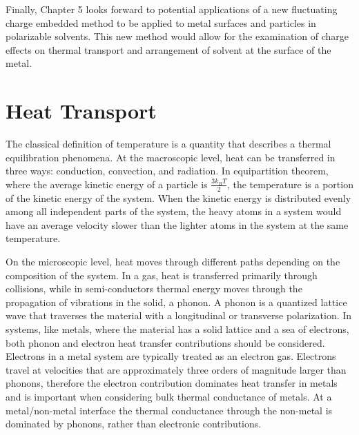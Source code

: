 Finally, Chapter 5 looks forward to potential applications of a new fluctuating charge embedded method to be applied to metal surfaces and particles in polarizable solvents. This new method would allow for the examination of charge effects on thermal transport and arrangement of solvent at the surface of the metal.

\section{Heat Transport}
The classical definition of temperature is a quantity that describes a thermal equilibration phenomena. At the macroscopic level, heat can be transferred in three ways: conduction, convection, and radiation.\cite{Chen2005} 
In equipartition theorem, where the average kinetic energy of a particle is \(\frac{3k_{B}T}{2}\), the temperature is a portion of the kinetic energy of the system. \cite{Goldstein2001}
When the kinetic energy is distributed evenly among all independent parts of the system, the heavy atoms in a system would have an average velocity slower than the lighter atoms in the system at the same temperature.

On the microscopic level, heat moves through different paths depending on the composition of the system.\cite{Chen2005}
In a gas, heat is transferred primarily through collisions, while in semi-conductors thermal energy moves through the propagation of vibrations in the solid, a phonon. 
A phonon is a quantized lattice wave that traverses the material with a longitudinal or transverse polarization.\cite{Kittel} 
In systems, like metals, where the material has a solid lattice and a sea of electrons, both phonon and electron heat transfer contributions should be considered.\cite{Kittel} 
Electrons in a metal system are typically treated as an electron gas.
Electrons travel at velocities that are approximately three orders of magnitude larger than phonons, therefore the electron contribution dominates heat transfer in metals and is important when considering bulk thermal conductance of metals.
At a metal/non-metal interface the thermal conductance through the non-metal is dominated by phonons, rather than electronic contributions.\cite{Chen2005, Cahill2011, Stoner1993}

